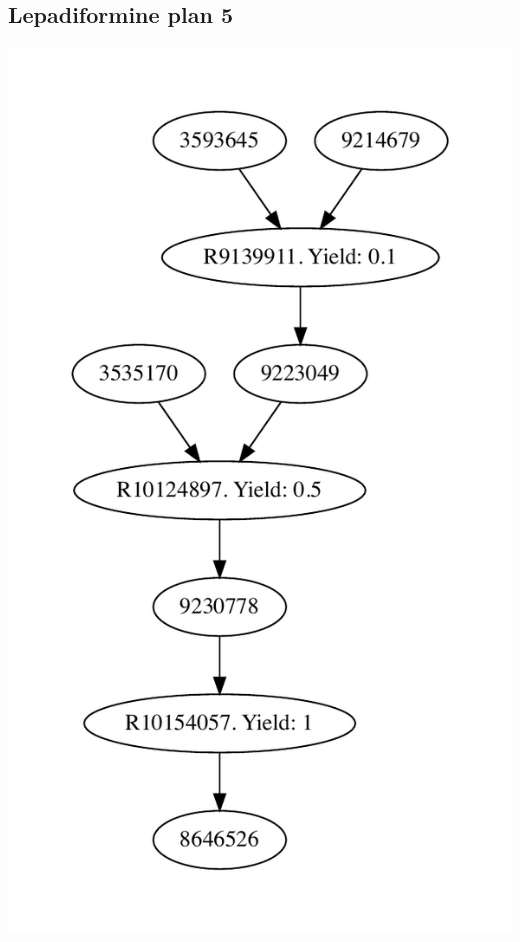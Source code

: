 \documentclass[a4paper,10pt,titlepage]{paper}
\begin{document}
\subsection{Lepadiformine plan 5}
\centering
\includegraphics[scale=0.4]{Synteseplaner/Lepadiformine/plan5.pdf}
\label{Appendix::Lepadiformine5}
\end{document}
